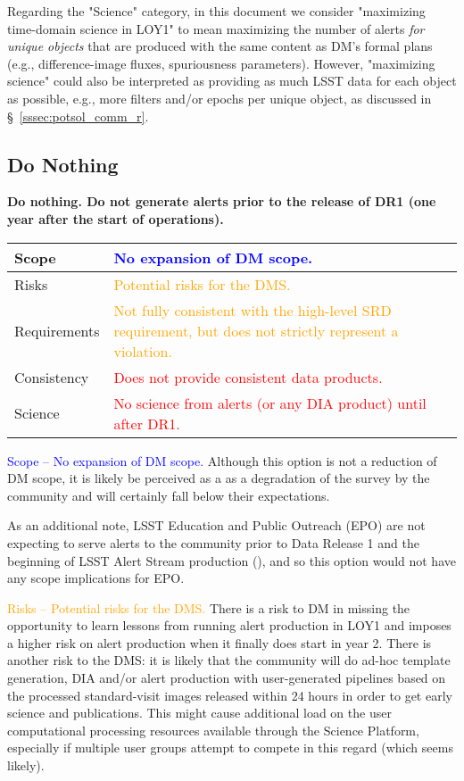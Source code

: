 \documentclass[DM,toc]{lsstdoc}
\begin{document}
Regarding the "Science" category, in this document we consider "maximizing time-domain science in LOY1" to mean maximizing the number of alerts {\em for unique objects} that are produced with the same content as DM's formal plans (e.g., difference-image fluxes, spuriousness parameters).
However, "maximizing science" could also be interpreted as providing as much LSST data for each object as possible, e.g., more filters and/or epochs per unique object, as discussed in \S~\ref{sssec:potsol_comm_r}.

\clearpage
\subsection{Do Nothing}\label{ssec:potsol_donothing}

{\bf Do nothing. Do not generate alerts prior to the release of DR1 (one year after the start of operations).}

\begin{center}
\begin{tabular}{|p{2.5cm}|p{13cm}|}
\hline
Scope & \textcolor{blue}{No expansion of DM scope.} \\
\hline
Risks & \textcolor{orange}{Potential risks for the DMS.} \\
\hline
Requirements & \textcolor{orange}{Not fully consistent with the high-level SRD requirement, but does not strictly represent a violation.} \\
\hline
Consistency & \textcolor{red}{Does not provide consistent data products.} \\
\hline
Science & \textcolor{red}{No science from alerts (or any DIA product) until after DR1.} \\
\hline
\end{tabular}
\end{center}

\textcolor{blue}{ Scope -- No expansion of DM scope.} 
Although this option is not a reduction of DM scope, it is likely be perceived as a as a degradation of the survey by the community and will certainly fall below their expectations.

As an additional note, LSST Education and Public Outreach (EPO) are not expecting to serve alerts to the community prior to Data Release 1 and the beginning of LSST Alert Stream production (), and so this option would not have any scope implications for EPO. 

\textcolor{orange}{ Risks -- Potential risks for the DMS.}
There is a risk to DM in missing the opportunity to learn lessons from running alert production in LOY1
and imposes a higher risk on alert production when it finally does start in year 2.
There is another risk to the DMS: it is likely that the community will do ad-hoc template generation, DIA and/or alert production with user-generated pipelines based on the processed standard-visit images released within 24 hours in order to get early science and publications.
This might cause additional load on the user computational processing resources available through the Science Platform, especially if multiple user groups attempt to compete in this regard (which seems likely).
\end{document}
